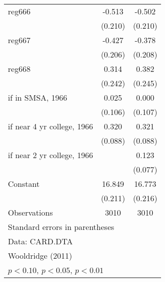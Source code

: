 \begin{table}[htbp]
\begin{tabular}{l*{2}{c}}
\addlinespace
reg666              &      -0.513\sym{**} &      -0.502\sym{**} \\
                    &     (0.210)         &     (0.210)         \\
\addlinespace
reg667              &      -0.427\sym{**} &      -0.378\sym{*}  \\
                    &     (0.206)         &     (0.208)         \\
\addlinespace
reg668              &       0.314         &       0.382         \\
                    &     (0.242)         &     (0.245)         \\
\addlinespace
=1 if in SMSA, 1966 &       0.025         &       0.000         \\
                    &     (0.106)         &     (0.107)         \\
\addlinespace
=1 if near 4 yr college, 1966&       0.320\sym{***}&       0.321\sym{***}\\
                    &     (0.088)         &     (0.088)         \\
\addlinespace
=1 if near 2 yr college, 1966&                     &       0.123         \\
                    &                     &     (0.077)         \\
\addlinespace
Constant            &      16.849\sym{***}&      16.773\sym{***}\\
                    &     (0.211)         &     (0.216)         \\
\midrule
Observations        &        3010         &        3010         \\
\bottomrule
\multicolumn{3}{l}{\footnotesize Standard errors in parentheses}\\
\multicolumn{3}{l}{\footnotesize Data: CARD.DTA}\\
\multicolumn{3}{l}{\footnotesize Wooldridge (2011)}\\
\multicolumn{3}{l}{\footnotesize \sym{*} \(p<0.10\), \sym{**} \(p<0.05\), \sym{***} \(p<0.01\)}\\
\end{tabular}
\end{table}
